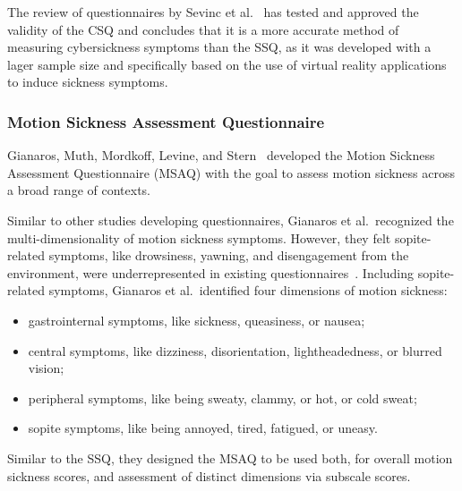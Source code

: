 The review of questionnaires by Sevinc et al.~\cite{Sevinc2020} has tested and approved the validity of the CSQ and
concludes that it is a more accurate method of measuring cybersickness symptoms than the SSQ, as it was developed
with a lager sample size and specifically based on the use of virtual reality applications to induce sickness symptoms.


\subsubsection{Motion Sickness Assessment Questionnaire}\label{subsubsec:motion-sickness-assessment-questionnaire}

Gianaros, Muth, Mordkoff, Levine, and Stern~\cite{Gianaros2001} developed the Motion Sickness Assessment
Questionnaire (MSAQ) with the goal to assess motion sickness across a broad range of contexts.

Similar to other studies developing questionnaires, Gianaros et al.\ recognized the multi-dimensionality of motion
sickness symptoms.
However, they felt sopite-related symptoms, like drowsiness, yawning, and disengagement from the environment, were
underrepresented in existing questionnaires~\cite{Gianaros2001,Graybiel1976}.
Including sopite-related symptoms, Gianaros et al.\ identified four dimensions of motion sickness:
\begin{itemize}
    \item gastrointernal symptoms, like sickness, queasiness, or nausea;
    \item central symptoms, like dizziness, disorientation, lightheadedness, or blurred vision;
    \item peripheral symptoms, like being sweaty, clammy, or hot, or cold sweat;
    \item sopite symptoms, like being annoyed, tired, fatigued, or uneasy.
\end{itemize}
Similar to the SSQ, they designed the MSAQ to be used both, for overall motion sickness scores, and assessment of 
distinct dimensions via subscale scores.

